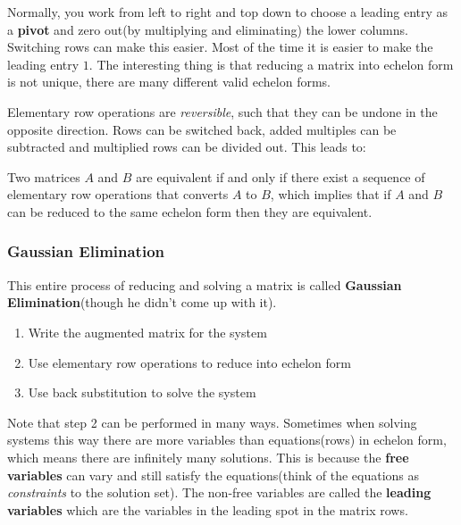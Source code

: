 \documentclass{article}
\begin{document}
Normally, you work from left to right and top down to choose a leading entry as a \textbf{pivot} and zero out(by multiplying and eliminating) the lower columns. Switching rows can make this easier. Most of the time it is easier to make the leading entry $1$. The interesting thing is that reducing a matrix into echelon form is not unique, there are many different valid echelon forms.

Elementary row operations are \textit{reversible}, such that they can be undone in the opposite direction. Rows can be switched back, added multiples can be subtracted and multiplied rows can be divided out. This leads to:

Two matrices $A$ and $B$ are equivalent if and only if there exist a sequence of elementary row operations that converts $A$ to $B$, which implies that if $A$ and $B$ can be reduced to the same echelon form then they are equivalent.

\subsubsection{Gaussian Elimination}
This entire process of reducing and solving a matrix is called \textbf{Gaussian Elimination}(though he didn't come up with it).
\begin{enumerate}
    \item Write the augmented matrix for the system
    \item Use elementary row operations to reduce into echelon form
    \item Use back substitution to solve the system
\end{enumerate}
Note that step 2 can be performed in many ways. Sometimes when solving systems this way there are more variables than equations(rows) in echelon form, which means there are infinitely many solutions. This is because the \textbf{free variables} can vary and still satisfy the equations(think of the equations as \textit{constraints} to the solution set). The non-free variables are called the \textbf{leading variables} which are the variables in the leading spot in the matrix rows.
\end{document}
